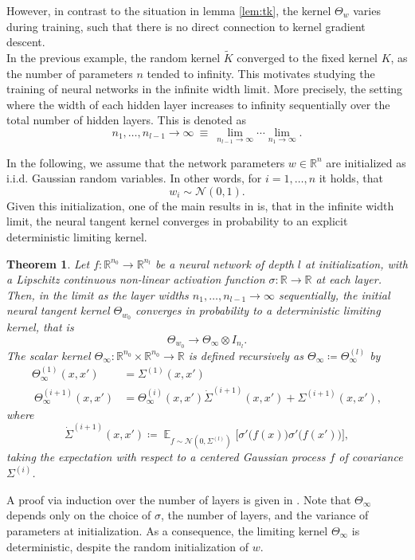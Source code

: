 \documentclass[11pt, a4paper]{article}
\newtheorem{theorem}{Theorem}[section]
\newcommand{\R}{\mathbb{R}}
\DeclareMathOperator*{\E}{\mathbb{E}}
\begin{document}
However, in contrast to the situation in lemma \ref{lem:tk}, the kernel $\Theta_w$ varies during training, such that there is no direct connection to kernel gradient descent.\\

In the previous example, the random kernel $\tilde{K}$ converged to the fixed kernel $K$, as the number of parameters $n$ tended to infinity. This motivates studying the training of neural networks in the infinite width limit. More precisely, the setting where the width of each hidden layer increases to infinity sequentially over the total number of hidden layers. This is denoted as
\[ n_1, \dots, n_{l-1} \to \infty \ \equiv \ \lim_{n_{l-1} \to \infty} \cdots \lim_{n_1 \to \infty}. \]

In the following, we assume that the network parameters $w \in \R^n$ are initialized as i.i.d. Gaussian random variables. In other words, for $i=1, \dots, n$ it holds, that
\[ w_i \sim \mathcal{N}(0,1). \] 
Given this initialization, one of the main results in \cite{NTK} is, that in the infinite width limit, the neural tangent kernel converges in probability to an explicit deterministic limiting kernel.

\begin{theorem}
Let $f: \R^{n_0} \to \R^{n_l}$ be a neural network of depth $l$ at initialization, with a Lipschitz continuous non-linear activation function $\sigma: \R \to \R$ at each layer. Then, in the limit as the layer widths $n_1, \dots, n_{l-1} \to \infty$ sequentially, the initial neural tangent kernel $\Theta_{w_0}$ converges in probability to a deterministic limiting kernel, that is
\[ \Theta_{w_0} \to \Theta_{\infty} \otimes I_{n_l}. \]
The scalar kernel $\Theta_{\infty} : \R^{n_0} \times \R^{n_0} \to \R$ is defined recursively as $\Theta_{\infty} \coloneq \Theta_{\infty}^{(l)}$ by
\[ \begin{split} 
\Theta_{\infty}^{(1)} (x,x') &= \Sigma^{(1)}(x,x') \\\
\Theta_{\infty}^{(i+1)}(x,x') &= \Theta_{\infty}^{(i)}(x,x') \dot{\Sigma}^{(i+1)}(x,x') + \Sigma^{(i+1)}(x,x'),
\end{split} \]
where 
\[ \dot{\Sigma}^{(i+1)}(x,x') \coloneq \E_{f \sim \mathcal{N}(0, \Sigma^{(l)})} \Big [ \sigma' \big ( f(x) \big ) \sigma' \big ( f(x') \big) \Big ], \]
taking the expectation with respect to a centered Gaussian process $f$ of covariance $\Sigma^{(i)}$.
\end{theorem}

A proof via induction over the number of layers is given in \cite{NTK}. Note that $\Theta_{\infty}$ depends only on the choice of $\sigma$, the number of layers, and the variance of parameters at initialization. As a consequence, the limiting kernel $\Theta_{\infty}$ is deterministic, despite the random initialization of $w$. \\
\end{document}
